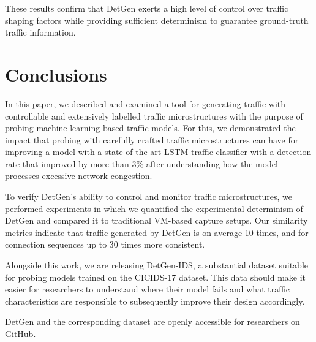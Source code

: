 \documentclass[runningheads]{llncs}
\begin{document}
These results confirm that DetGen exerts a high level of control over traffic shaping factors while providing sufficient determinism to guarantee ground-truth traffic information.


\section{Conclusions}\label{Sec:Conclusion}

In this paper, we described and examined a tool for generating traffic with controllable and extensively labelled traffic microstructures with the purpose of probing machine-learning-based traffic models. For this, we demonstrated the impact that probing with carefully crafted traffic microstructures can have for improving a model with a state-of-the-art LSTM-traffic-classifier with a detection rate that improved by more than 3\% after understanding how the model processes excessive network congestion. 

To verify DetGen's ability to control and monitor traffic microstructures, we performed experiments in which we quantified the experimental determinism of DetGen and compared it to traditional VM-based capture setups. Our similarity metrics indicate that traffic generated by DetGen is on average 10 times, and for connection sequences up to 30 times more consistent.

Alongside this work, we are releasing DetGen-IDS, a substantial dataset suitable for probing models trained on the CICIDS-17 dataset. This data should make it easier for researchers to understand where their model fails and what traffic characteristics are responsible to subsequently improve their design accordingly.

DetGen and the corresponding dataset are openly accessible for researchers on GitHub.


\end{document}
